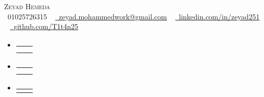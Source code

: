\documentclass[letterpaper,11pt]{article}
\makeatletter
\newcommand{\resumeSubheading}[4]{
  \vspace{-2pt}\item
    \begin{tabular*}{1.0\textwidth}[t]{l@{\extracolsep{\fill}}r}
      \textbf{#1} & \textbf{\small #2} \\
      \textit{\small#3} & \textit{\small #4} \\
    \end{tabular*}\vspace{-7pt}
}
\newcommand{\resumeEduSubheading}[4]{
  \vspace{-2pt}\item
    \begin{tabular*}{1.0\textwidth}[t]{l@{\extracolsep{\fill}}r}
      \textbf{#1} & \textbf{\small #2} \\
      \textit{\small#3} & \textit{\small #4} \\
    \end{tabular*}\vspace{-7pt}
}
\newcommand{\resumeProjectHeading}[2]{
    \item
    \begin{tabular*}{1.001\textwidth}{l@{\extracolsep{\fill}}r}
      \small#1 & \textbf{\small #2}\\
    \end{tabular*}\vspace{-7pt}
}
\newcommand{\resumeSubHeadingListStart}{\begin{itemize}[leftmargin=0.0in, label={}]}
\newcommand{\resumeSubHeadingListEnd}{\end{itemize}}
\newcommand{\summaryPlaceholder}[1]{#1}
\newcommand{\sectionPlaceholder}[1]{#1}
\newcommand{\eduPlaceholder}[1]{#1}
\newcommand{\projectsPlaceholder}[1]{#1}
\newcommand{\expPlaceholder}[1]{#1}
\newcommand{\infoPlaceholder}[1]{#1}
\newcommand{\techSkillsPlaceholder}[1]{#1}
\newcommand{\softSkillsPlaceholder}[1]{#1}
\makeatother
\begin{document}
\begin{center}
  \infoPlaceholder{
    {\Huge \scshape Zeyad Hemeda} \\ \vspace{1pt}
    \small \raisebox{-0.1\height}\faPhone\ 01025726315 ~ \href{mailto:zeyad.mohammedwork@gmail.com}{\raisebox{-0.2\height}\faEnvelope\  \underline{zeyad.mohammedwork@gmail.com}} ~ 
    \href{https://linkedin.com/in/zeyad251}{\raisebox{-0.2\height}\faLinkedin\ \underline{linkedin.com/in/zeyad251}}  ~
    \href{https://github.com/T1t4n25}{\raisebox{-0.2\height}\faGithub\ \underline{github.com/T1t4n25}}
  }
    \vspace{-8pt}
\end{center}

\sectionPlaceholder{}
  \resumeSubHeadingListStart
  \eduPlaceholder{
    \resumeEduSubheading
    { }{}
    {}{}
  }
  \resumeSubHeadingListEnd
\vspace{-16pt}

\sectionPlaceholder{}
\small{
  \summaryPlaceholder{}
}
\vspace{-10pt}

\sectionPlaceholder{}

  \resumeSubHeadingListStart
    \expPlaceholder{
    \resumeSubheading
      {}{}
      {}{}
      
}
  \resumeSubHeadingListEnd
  \vspace{-16pt}

\sectionPlaceholder{}
\vspace{-5pt}
\resumeSubHeadingListStart

\projectsPlaceholder{

  \resumeProjectHeading
    {\textbf{}  \emph{}}{}
    
    

  
    }
    \resumeSubHeadingListEnd
\vspace{-16pt}

\sectionPlaceholder{}
 \begin{itemize}[leftmargin=0.15in, label={}]

    \small{\item{
    \techSkillsPlaceholder{
     \textbf{}{} \\

    }
    }
    }
 \end{itemize}
 \vspace{-16pt}
 \sectionPlaceholder{}
    \begin{itemize}[leftmargin=0.15in, label={}]
      \small{\item{
      \softSkillsPlaceholder{
        \emph{}
      }
        }}
    \end{itemize}
    \vspace{-10pt}
\end{document}
